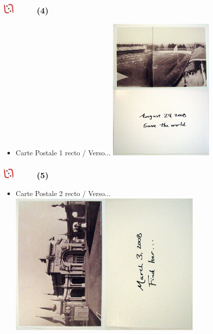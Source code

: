 \documentclass[slidetop,11pt]{beamer}
\def\moreInFrameTitleLeftt{\includegraphics[height=0.5cm]{img/ligueludique-0.png}~~~~~}
\begin{document}
\begin{frame}
	\frametitle{\moreInFrameTitleLeftt \sectionPartIIaIV  (4) }
	\begin{itemize}
		\item Carte Postale 1 recto / Verso...
		\includegraphics[height=7.00cm]{img/argTheLostRing/2299369980_6cd3e50860_o.jpg}
	\end{itemize}
\end{frame} 

\begin{frame}
	\frametitle{\moreInFrameTitleLeftt \sectionPartIIaIV  (5) }
	\begin{itemize}
		\item Carte Postale 2 recto / Verso...
		\includegraphics[height=7.00cm]{img/argTheLostRing/2299370206_89505225a9_o.jpg}
	\end{itemize}
\end{frame} 
\end{document}
